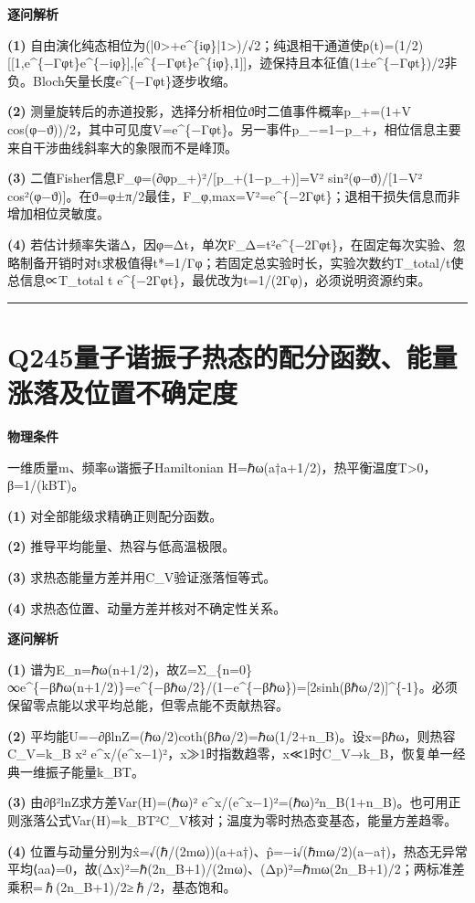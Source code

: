 \documentclass[UTF8,a4paper,11pt,oneside,openany]{ctexbook}
\begin{document}
\par\medskip\noindent\textbf{逐问解析}
\par\noindent\textbf{(1)} 自由演化纯态相位为(|0>+e\textasciicircum{}\{iφ\}|1>)/√2；纯退相干通道使ρ(t)=(1/2)[[1,e\textasciicircum{}\{−Γφt\}e\textasciicircum{}\{−iφ\}],[e\textasciicircum{}\{−Γφt\}e\textasciicircum{}\{iφ\},1]]，迹保持且本征值(1±e\textasciicircum{}\{−Γφt\})/2非负。Bloch矢量长度e\textasciicircum{}\{−Γφt\}逐步收缩。
\par\noindent\textbf{(2)} 测量旋转后的赤道投影，选择分析相位ϑ时二值事件概率p\_+=(1+V cos(φ−ϑ))/2，其中可见度V=e\textasciicircum{}\{−Γφt\}。另一事件p\_−=1−p\_+，相位信息主要来自干涉曲线斜率大的象限而不是峰顶。
\par\noindent\textbf{(3)} 二值Fisher信息F\_φ=(∂φp\_+)²/[p\_+(1−p\_+)]=V² sin²(φ−ϑ)/[1−V² cos²(φ−ϑ)]。在ϑ=φ±π/2最佳，F\_φ,max=V²=e\textasciicircum{}\{−2Γφt\}；退相干损失信息而非增加相位灵敏度。
\par\noindent\textbf{(4)} 若估计频率失谐Δ，因φ=Δt，单次F\_Δ=t²e\textasciicircum{}\{−2Γφt\}，在固定每次实验、忽略制备开销时对t求极值得t*=1/Γφ；若固定总实验时长，实验次数约T\_total/t使总信息∝T\_total t e\textasciicircum{}\{−2Γφt\}，最优改为t=1/(2Γφ)，必须说明资源约束。

\par\bigskip\hrule\bigskip
\section*{Q245\quad 量子谐振子热态的配分函数、能量涨落及位置不确定度}
\textbf{物理条件}\par 一维质量m、频率ω谐振子Hamiltonian H=ℏω(a†a+1/2)，热平衡温度T>0，β=1/(kBT)。
\par\noindent\textbf{(1)} 对全部能级求精确正则配分函数。
\par\noindent\textbf{(2)} 推导平均能量、热容与低高温极限。
\par\noindent\textbf{(3)} 求热态能量方差并用C\_V验证涨落恒等式。
\par\noindent\textbf{(4)} 求热态位置、动量方差并核对不确定性关系。

\par\medskip\noindent\textbf{逐问解析}
\par\noindent\textbf{(1)} 谱为E\_n=ℏω(n+1/2)，故Z=Σ\_\{n=0\}∞e\textasciicircum{}\{−βℏω(n+1/2)\}=e\textasciicircum{}\{−βℏω/2\}/(1−e\textasciicircum{}\{−βℏω\})=[2sinh(βℏω/2)]\textasciicircum{}\{-1\}。必须保留零点能以求平均总能，但零点能不贡献热容。
\par\noindent\textbf{(2)} 平均能U=−∂βlnZ=(ℏω/2)coth(βℏω/2)=ℏω(1/2+n\_B)。设x=βℏω，则热容C\_V=k\_B x² e\textasciicircum{}x/(e\textasciicircum{}x−1)²，x≫1时指数趋零，x≪1时C\_V→k\_B，恢复单一经典一维振子能量k\_BT。
\par\noindent\textbf{(3)} 由∂β²lnZ求方差Var(H)=(ℏω)² e\textasciicircum{}x/(e\textasciicircum{}x−1)²=(ℏω)²n\_B(1+n\_B)。也可用正则涨落公式Var(H)=k\_BT²C\_V核对；温度为零时热态变基态，能量方差趋零。
\par\noindent\textbf{(4)} 位置与动量分别为x̂=√(ℏ/(2mω))(a+a†)、p̂=−i√(ℏmω/2)(a−a†)，热态无异常平均⟨aa⟩=0，故(Δx)²=ℏ(2n\_B+1)/(2mω)、(Δp)²=ℏmω(2n\_B+1)/2；两标准差乘积=ℏ(2n\_B+1)/2≥ℏ/2，基态饱和。
\end{document}
